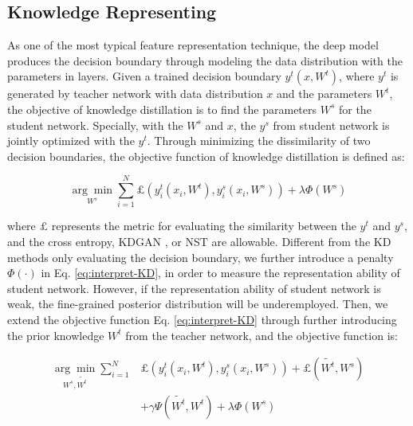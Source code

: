 \documentclass[10pt,twocolumn,letterpaper]{article}
\begin{document}
\subsection{Knowledge Representing} \label{3dot1}
As one of the most typical feature representation technique,
the deep model produces the decision boundary through
modeling the data distribution with the parameters in layers.
Given a trained decision boundary $y^{t}(x, W^t)$,
where $y^t$ is generated by teacher network with
data distribution $x$ and the parameters $W^t$,
the objective of knowledge distillation is
to find the parameters $W^s$ for the student network.
Specially,
with the $W^s$ and $x$,
the $y^s$ from student network
is jointly optimized with the $y^t$.
Through minimizing the dissimilarity of two decision boundaries,
the objective function of knowledge distillation is defined as:

\begin{equation}
\underset{W^s}{\arg\min} \sum_{i=1}^{N}\pounds(y_{i}^{t}(x_i, W^t), y_{i}^{s}(x_i, W^s)) + \lambda \Phi(W^s)
\label{eq:interpret-KD}
\end{equation}

where $\pounds$ represents the metric for evaluating
the similarity between the $y^t$ and $y^s$,
and the cross entropy, KDGAN \cite{wang2018kdgan}, or NST \cite{huang2017like} are allowable.
Different from the KD methods only evaluating the decision boundary,
we further introduce a penalty $\Phi(\cdot)$ in Eq. \ref{eq:interpret-KD},
in order to measure the representation ability of student network.
However,
if the representation ability of student network is weak,
the fine-grained posterior distribution will be underemployed.
Then,
we extend the objective function Eq. \ref{eq:interpret-KD}
through further introducing the prior knowledge $W^t$ from the teacher network,
and the objective function is:

\begin{equation}
\begin{split}
\underset{W^s, \tilde{W^t}}{\arg\min} \sum_{i=1}^{N}&\pounds(y_{i}^{t}(x_i, W^t), y_{i}^{s}(x_i, W^s)) + \pounds(\tilde{W^t}, W^s) \\
&+ \gamma \Psi(\tilde{W^t}, W^t) + \lambda \Phi(W^s)
\label{eq:interpret-KD-revised}
\end{split}
\end{equation}
\end{document}
